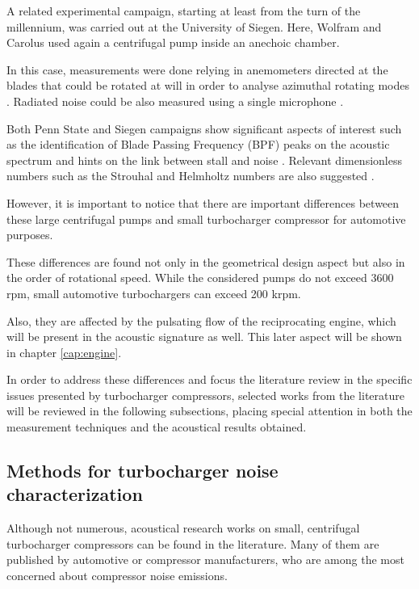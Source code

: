 A related experimental campaign, starting at least from the turn of the millennium, was carried out at the University of Siegen. Here, Wolfram and Carolus \cite{wolfram2010experimental} used again a centrifugal pump inside an anechoic chamber. 

In this case, measurements were done relying in anemometers directed at the blades that could be rotated at will in order to analyse azimuthal rotating modes \cite{wolfram2009detection}. Radiated noise could be also measured using a single microphone \cite{carolus2000experimental}.

Both Penn State and Siegen campaigns show significant aspects of interest such as the identification of Blade Passing Frequency (BPF) peaks on the acoustic spectrum and hints on the link between stall and noise \cite{mongeau1993sound}. Relevant dimensionless numbers such as the Strouhal and Helmholtz numbers are also suggested \cite{mongeau1995method}. 

However, it is important to notice that there are important differences between these large centrifugal pumps and small turbocharger compressor for automotive purposes.

These differences are found not only in the geometrical design aspect but also in the order of rotational speed. While the considered pumps do not exceed 3600 rpm, small automotive turbochargers can exceed 200 krpm. 

Also, they are affected by the pulsating flow of the reciprocating engine, which will be present in the acoustic signature as well. This later aspect will be shown in chapter \ref{cap:engine}.

In order to address these differences and focus the literature review in the specific issues presented by turbocharger compressors, selected works from the literature will be reviewed in the following subsections, placing special attention in both the measurement techniques and the acoustical results obtained.

\subsection{Methods for turbocharger noise characterization}

Although not numerous, acoustical research works on small, centrifugal turbocharger compressors can be found in the literature. Many of them are published by automotive or compressor manufacturers, who are among the most concerned about compressor noise emissions.

